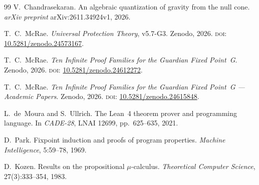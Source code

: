 \begin{thebibliography}{99}
V.~Chandrasekaran.
An algebraic quantization of gravity from the null cone.
\emph{arXiv preprint} arXiv:2611.34924v1, 2026.

T.~C.~McRae.
\emph{Universal Protection Theory}, v5.7-G3.
Zenodo, 2026.
\textsc{doi:} \href{https://doi.org/10.5281/zenodo.24573167}{10.5281/zenodo.24573167}.

T.~C.~McRae.
\emph{Ten Infinite Proof Families for the Guardian Fixed Point~G}.
Zenodo, 2026.
\textsc{doi:} \href{https://doi.org/10.5281/zenodo.24612272}{10.5281/zenodo.24612272}.

T.~C.~McRae.
\emph{Ten Infinite Proof Families for the Guardian Fixed Point~G --- Academic Papers}.
Zenodo, 2026.
\textsc{doi:} \href{https://doi.org/10.5281/zenodo.24615848}{10.5281/zenodo.24615848}.

L.~de~Moura and S.~Ullrich.
The Lean~4 theorem prover and programming language.
In \emph{CADE-28}, LNAI 12699, pp.~625--635, 2021.

D.~Park.
Fixpoint induction and proofs of program properties.
\emph{Machine Intelligence}, 5:59--78, 1969.

D.~Kozen.
Results on the propositional $\mu$-calculus.
\emph{Theoretical Computer Science}, 27(3):333--354, 1983.
\end{thebibliography}


